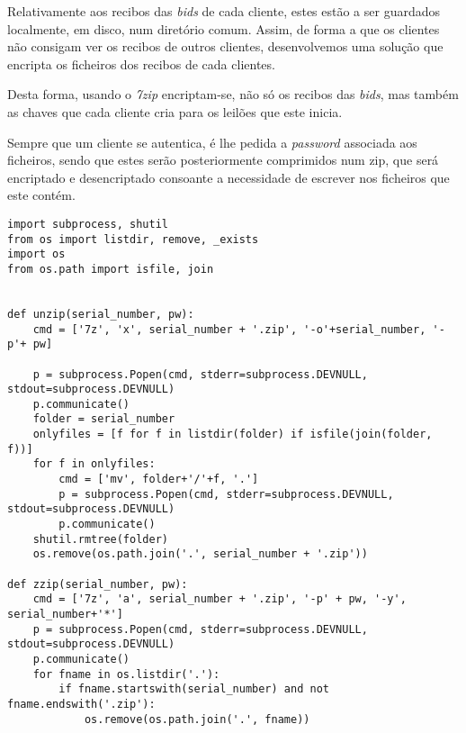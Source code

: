 \documentclass[12pt]{article}
\begin{document}
\par Relativamente aos recibos das \textit{bids} de cada cliente, estes estão a ser guardados localmente, em disco, num diretório comum. Assim, de forma a que os clientes não consigam ver os recibos de outros clientes, desenvolvemos uma solução que encripta os ficheiros dos recibos de cada clientes.

\par Desta forma, usando o \textit{7zip} encriptam-se, não só os recibos das \textit{bids}, mas também as chaves que cada cliente cria para os leilões que este inicia. 

\par Sempre que um cliente se autentica, é lhe pedida a \textit{password} associada aos ficheiros, sendo que estes serão posteriormente comprimidos num zip, que será encriptado e desencriptado consoante a necessidade de escrever nos ficheiros que este contém.

\vspace{5mm} %

\begin{lstlisting}[caption={Encriptação e Decriptação de Ficheiros},captionpos=b]
import subprocess, shutil
from os import listdir, remove, _exists
import os
from os.path import isfile, join


def unzip(serial_number, pw):
    cmd = ['7z', 'x', serial_number + '.zip', '-o'+serial_number, '-p'+ pw]

    p = subprocess.Popen(cmd, stderr=subprocess.DEVNULL, stdout=subprocess.DEVNULL)
    p.communicate()
    folder = serial_number
    onlyfiles = [f for f in listdir(folder) if isfile(join(folder, f))]
    for f in onlyfiles:
        cmd = ['mv', folder+'/'+f, '.']
        p = subprocess.Popen(cmd, stderr=subprocess.DEVNULL, stdout=subprocess.DEVNULL)
        p.communicate()
    shutil.rmtree(folder)
    os.remove(os.path.join('.', serial_number + '.zip'))
    
def zzip(serial_number, pw):
    cmd = ['7z', 'a', serial_number + '.zip', '-p' + pw, '-y', serial_number+'*']
    p = subprocess.Popen(cmd, stderr=subprocess.DEVNULL, stdout=subprocess.DEVNULL)
    p.communicate()
    for fname in os.listdir('.'):
        if fname.startswith(serial_number) and not fname.endswith('.zip'):
            os.remove(os.path.join('.', fname))

\end{lstlisting}
\end{document}
